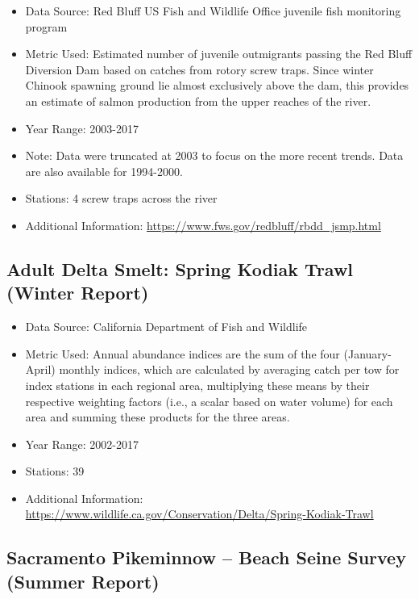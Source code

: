 \documentclass[
]{book}
\providecommand{\tightlist}{%
  \setlength{\itemsep}{0pt}\setlength{\parskip}{0pt}}
\begin{document}
\begin{itemize}
\tightlist
\item
  Data Source: Red Bluff US Fish and Wildlife Office juvenile fish monitoring program
\item
  Metric Used: Estimated number of juvenile outmigrants passing the Red Bluff Diversion Dam based on catches from rotory screw traps. Since winter Chinook spawning ground lie almost exclusively above the dam, this provides an estimate of salmon production from the upper reaches of the river.
\item
  Year Range: 2003-2017
\item
  Note: Data were truncated at 2003 to focus on the more recent trends. Data are also available for 1994-2000.
\item
  Stations: 4 screw traps across the river
\item
  Additional Information: \url{https://www.fws.gov/redbluff/rbdd_jsmp.html}
\end{itemize}

\hypertarget{adult-delta-smelt-spring-kodiak-trawl-winter-report}{%
\subsection{Adult Delta Smelt: Spring Kodiak Trawl (Winter Report)}\label{adult-delta-smelt-spring-kodiak-trawl-winter-report}}

\begin{itemize}
\tightlist
\item
  Data Source: California Department of Fish and Wildlife
\item
  Metric Used: Annual abundance indices are the sum of the four (January-April) monthly indices, which are calculated by averaging catch per tow for index stations in each regional area, multiplying these means by their respective weighting factors (i.e., a scalar based on water volume) for each area and summing these products for the three areas.
\item
  Year Range: 2002-2017
\item
  Stations: 39
\item
  Additional Information: \url{https://www.wildlife.ca.gov/Conservation/Delta/Spring-Kodiak-Trawl}
\end{itemize}

\hypertarget{sacramento-pikeminnow-beach-seine-survey-summer-report}{%
\subsection{Sacramento Pikeminnow -- Beach Seine Survey (Summer Report)}\label{sacramento-pikeminnow-beach-seine-survey-summer-report}}
\end{document}
